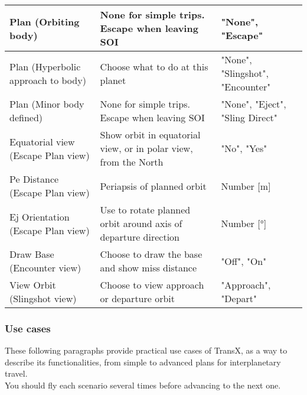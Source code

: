 \documentclass[Orbiter User Manual.tex]{subfiles}
\begin{document}
\begin{longtable}{ |p{}|p{}|p{}| }
	\hline\rule{0pt}{2ex}
	Plan (Orbiting body) & None for simple trips. Escape when leaving SOI & "None", "Escape"\\
	\hline\rule{0pt}{2ex}
	Plan (Hyperbolic approach to body) & Choose what to do at this planet & "None", "Slingshot", "Encounter"\\
	\hline\rule{0pt}{2ex}
	Plan (Minor body defined) & None for simple trips. Escape when leaving SOI & "None", "Eject", "Sling Direct"\\
	\hline\rule{0pt}{2ex}
	Equatorial view (Escape Plan view) & Show orbit in equatorial view, or in polar view, from the North & "No", "Yes"\\
	\hline\rule{0pt}{2ex}
	Pe Distance (Escape Plan view) & Periapsis of planned orbit & Number [m]\\
	\hline\rule{0pt}{2ex}
	Ej Orientation (Escape Plan view) & Use to rotate planned orbit around axis of departure direction & Number [°]\\
	\hline\rule{0pt}{2ex}
	Draw Base (Encounter view) & Choose to draw the base and show miss distance & "Off", "On"\\
	\hline\rule{0pt}{2ex}
	View Orbit (Slingshot view) & Choose to view approach or departure orbit & "Approach", "Depart"\\
	\hline
	\end{longtable}


\subsubsection{Use cases}
These following paragraphs provide practical use cases of TransX, as a way to describe its functionalities, from simple to advanced plans for interplanetary travel.\\
You should fly each scenario several times before advancing to the next one.\\
\end{document}
